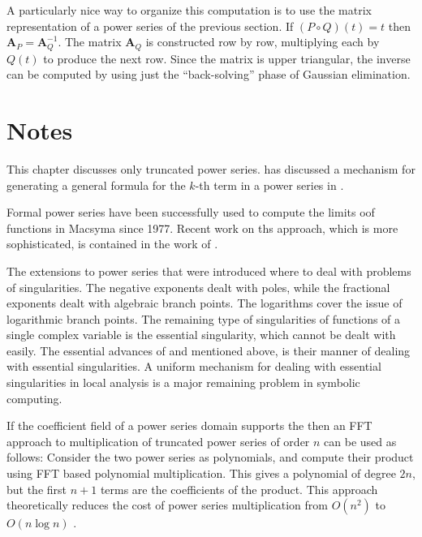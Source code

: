 A particularly nice way to organize this computation is to use the
matrix representation of a power series of the previous section.  If
$(P\circ Q)(t) = t$ then $\mathbf{A}_P = \mathbf{A}_Q^{-1}$.  The matrix
$\mathbf{A}_Q$ is constructed row by row, multiplying each by $Q(t)$ to
produce the next row.  Since the matrix is upper triangular, the
inverse can be computed by using just the ``back-solving'' phase of
Gaussian elimination.  

\section*{Notes}

\small

This chapter discusses only truncated power series.  {\Koepf} has
discussed a mechanism for generating a general formula for the
$k$-th term in a power series in \cite{Koepf92}.

 Formal power series have been successfully used to
compute the limits oof functions in Macsyma since 1977.  Recent work
on ths approach, which is more sophisticated, is contained in the
work of {\Shackell} \cite{Shackell90}.

The extensions to power series that were introduced where to deal with
problems of singularities.  The negative exponents dealt with poles,
while the fractional exponents dealt with algebraic branch points.
The logarithms cover the issue of logarithmic branch points.  The
remaining type of singularities of functions of a single complex variable
is the essential singularity, which cannot be dealt with easily.  The
essential advances of {\Shackell} and {\SalvyB} mentioned above, is their
manner of dealing with essential singularities.  A uniform mechanism
for dealing with essential singularities in local analysis is a major
remaining problem in symbolic computing.

If the coefficient field of a power series domain supports the
 then an FFT approach to multiplication of
truncated power series of order $n$ can be used as follows: Consider
the two power series as polynomials, and compute their product using
FFT based polynomial multiplication.  This gives a polynomial of
degree $2n$, but the first $n+1$ terms are the coefficients of the
product.  This approach theoretically reduces the cost of power series
multiplication from $O(n^2)$ to $O(n \log n)$ \cite{Knuth:II,Borodin75}.

